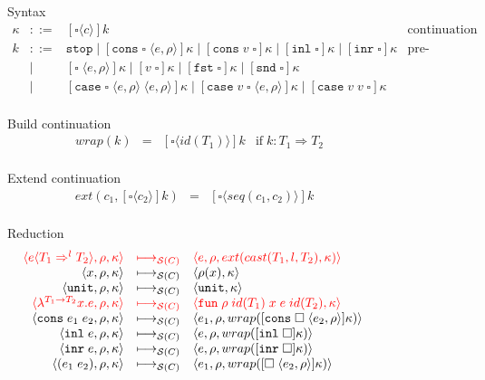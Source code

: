 \documentclass[acmsmall,review,anonymous]{acmart}\settopmatter{printfolios=true,printccs=false,printacmref=false}
\newcommand{\stxrule}[3]{#1 & ::= & #3 & \text{#2}\\}
\newcommand{\stxrulecont}[1]{& | & #1 & \\}
\newcommand{\funrule}[3]{#1 &=& #2 & #3\\}
\newcommand{\sOOinspect}[3]{\langle#1,#2,#3\rangle}
\newcommand{\sOOreturn}[2]{\langle#1,#2\rangle}
\newcommand{\sOOhalt}[1]{\mathtt{Halt} \; #1}
\newcommand{\eOOvar}[1]{#1}
\newcommand{\eOOsole}[0]{\mathtt{unit}}
\newcommand{\eOOlam}[4]{\lambda^{#1\rightarrow{}#2}#3.#4}
\newcommand{\eOOapp}[2]{(#1 \; #2)}
\newcommand{\eOOcons}[2]{\mathtt{cons} \; #1 \; #2}
\newcommand{\eOOinl}[1]{\mathtt{inl} \; #1}
\newcommand{\eOOinr}[1]{\mathtt{inr} \; #1}
\newcommand{\eOOcast}[4]{#1 \langle \cOOcast{#2}{#3}{#4} \rangle}
\newcommand{\cOOcast}[3]{#1 \Rightarrow^{#2} #3}
\newcommand{\rOOsucc}[1]{\mathtt{succ}\;#1}
\newcommand{\rOOfail}[1]{\mathtt{fail}\;#1}
\newcommand{\kOOmt}[0]{\mathtt{stop}}
\newcommand{\kOOconsI}[3]{[\mathtt{cons} \; \square \; \langle#1,#2\rangle ]#3}
\newcommand{\kOOconsII}[2]{[\mathtt{cons} \; #1 \; \square]#2}
\newcommand{\kOOinl}[1]{[\mathtt{inl}\; \square]#1}
\newcommand{\kOOinr}[1]{[\mathtt{inr}\; \square]#1}
\newcommand{\kOOappI}[3]{
  [\square \; \langle#1,#2\rangle]#3
}
\newcommand{\kOOappII}[2]{
  [#1 \; \square]#2}
\newcommand{\kOOcar}[1]{[\mathtt{fst} \; \square]#1}
\newcommand{\kOOcdr}[1]{[\mathtt{snd} \; \square]#1}
\newcommand{\kOOcaseI}[4]{
  [\mathtt{case} \; \square \; \langle#1,#3\rangle \; \langle#2,#3\rangle ]#4}
\newcommand{\kOOcaseII}[4]{
  [\mathtt{case} \; #1 \; \square \; \langle#2,#3\rangle ]#4}
\newcommand{\kOOcaseIII}[3]{
  [\mathtt{case} \; #1 \; #2 \; \square]#3}
\newcommand{\kOOcast}[2]{
  [\square \langle #1 \rangle]#2}
\newcommand{\hcvOOfun}[5]{\mathtt{fun} \; #2 \; #1 \; #3 \; #4 \; #5}
\newcommand{\hcvOOtt}[0]{\mathtt{unit}}
\newcommand{\sidecond}[1]{\text{if}\;#1}
\newcommand{\judgeSreduce}[3]{#2 \longmapsto_{\mathcal{S}(#1)} #3}
\newcommand{\redruleS}[3]{#1 & \longmapsto_{\mathcal{S}(C)} & #2 & #3\\}
\newcommand{\hiredruleS}[3]{\highlight{#1} & 
\highlight{\longmapsto_{\mathcal{S}(C)}} & \highlight{#2} & \highlight{#3} \\}
\newcommand{\highlight}[1]{{\color{red} #1}}
\begin{document}
\begin{figure}
  Syntax
  \[
  \begin{array}{rclr}
  \stxrule{\kappa}{continuation}{
    \kOOcast{c}{k}
  }
  \stxrule{k}{pre-continuations}{
    \kOOmt \mid{}
    \kOOconsI{e}{\rho}{\kappa} \mid
    \kOOconsII{v}{\kappa} \mid
    \kOOinl{\kappa} \mid
    \kOOinr{\kappa}
  }
  \stxrulecont{
    \kOOappI{e}{\rho}{\kappa} \mid
    \kOOappII{v}{\kappa} \mid
    \kOOcar{\kappa} \mid
    \kOOcdr{\kappa}
  }
  \stxrulecont{
    \kOOcaseI{e}{e}{\rho}{\kappa} \mid
    \kOOcaseII{v}{e}{\rho}{\kappa} \mid
    \kOOcaseIII{v}{v}{\kappa}
  }
  \end{array}
  \]
  
  Build continuation 
  \[
  \begin{array}{rclc}
  \funrule{wrap(k)}{\kOOcast{id(T_1)}{k}}{
    \sidecond{k : T_1 \Longrightarrow T_2}}
  \end{array}
  \]
  
  Extend continuation 
  \[
  \begin{array}{rclc}
  \funrule{ext(c_1,\kOOcast{c_2}{k})}{
    \kOOcast{seq(c_1,c_2)}{k}
  }{}
  \end{array}
  \]

  Reduction \fbox{$\judgeSreduce{C}{s}{s}$}
  \[
  \begin{array}{rclr}
  \hiredruleS{
    \sOOinspect{\eOOcast{e}{T_1}{l}{T_2}}{\rho}{\kappa}
  }{
    \sOOinspect{e}{\rho}{ext(cast(T_1,l,T_2),\kappa)}
  }{}
  \redruleS{
    \sOOinspect{\eOOvar{x}}{\rho}{\kappa}
  }{  
    \sOOreturn{\rho(x)}{\kappa}
  }{}
  \redruleS{
    \sOOinspect{\eOOsole}{\rho}{\kappa}
  }{
    \sOOreturn{\hcvOOtt}{\kappa}
  }{}
  \hiredruleS{
    \sOOinspect{\eOOlam{T_1}{T_2}{x}{e}}{\rho}{\kappa}
  }{
    \sOOreturn{\hcvOOfun{id(T_1)}{\rho}{x}{e}{id(T_2)}}{\kappa}
  }{}
  \redruleS{
    \sOOinspect{\eOOcons{e_1}{e_2}}{\rho}{\kappa}
  }{
    \sOOinspect{e_1}{\rho}{
      wrap(\kOOconsI{e_2}{\rho}{\kappa})
    }
  }{}
  \redruleS{
    \sOOinspect{\eOOinl{e}}{\rho}{\kappa}
  }{
    \sOOinspect{e}{\rho}{wrap(\kOOinl{\kappa})}
  }{}
  \redruleS{
    \sOOinspect{\eOOinr{e}}{\rho}{\kappa}
  }{
    \sOOinspect{e}{\rho}{wrap(\kOOinr{\kappa})}
  }{}
  \redruleS{
    \sOOinspect{\eOOapp{e_1}{e_2}}{\rho}{\kappa}
  }{
    \sOOinspect{e_1}{\rho}{wrap(\kOOappI{e_2}{\rho}{\kappa})}}{}
  

\end{array}\]
\end{figure}
\end{document}
